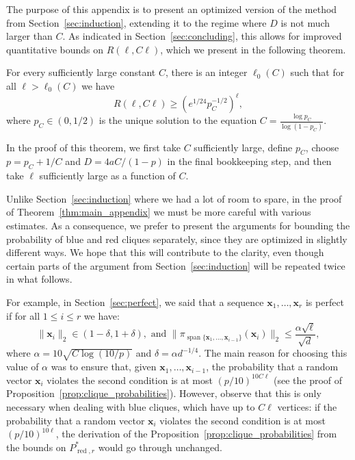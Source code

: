\documentclass[11pt]{amsart}
\theoremstyle{definition}
\def\bx{\boldsymbol{x}}
\DeclareMathOperator{\red}{red}
\DeclareMathOperator{\spn}{span}
\begin{document}
The purpose of this appendix is to present an optimized version of the method from Section~\ref{sec:induction}, extending it to the regime where $D$ is not much larger than $C$. As indicated in Section~\ref{sec:concluding}, this allows for improved quantitative bounds on $R(\ell, C\ell)$, which we present in the following theorem.

\begin{theorem}\label{thm:main_appendix}
For every sufficiently large constant $C$, there is an integer $\ell_0(C)$ such that for all $\ell>\ell_0(C)$ we have 
{\smaller[0.3]
\[R(\ell, C\ell)\geq (e^{1/24}p_C^{-1/2})^\ell,\]
}
where $p_C\in (0, 1/2)$ is the unique solution to the equation $C=\frac{\log p_C}{\log (1-p_C)}$.
\end{theorem}
In the proof of this theorem, we first take $C$ sufficiently large, define $p_C$, choose $p=p_C+1/C$ and $D=4aC/(1-p)$ in the final bookkeeping step, and then take $\ell$ sufficiently large as a function of $C$.

Unlike Section~\ref{sec:induction} where we had a lot of room to spare, in the proof of Theorem~\ref{thm:main_appendix} we must be more careful with various estimates. As a consequence, we prefer to present the arguments for bounding the probability of blue and red cliques separately, since they are optimized in slightly different ways. We hope that this will contribute to the clarity, even though certain parts of the argument from Section~\ref{sec:induction} will be repeated twice in what follows.

For example, in Section~\ref{sec:perfect}, we said that a sequence $\bx_1, \dots, \bx_r$ is perfect if for all $1\leq i \leq r$ we have:
{\smaller[0.3]
\[\|\bx_i\|_2\in (1-\delta, 1+\delta),\text{ and } \|\pi_{\spn\{\bx_1, \dots, \bx_{i-1}\}}(\bx_i)\|_2 \leq \frac{\alpha\sqrt{\ell}}{\sqrt{d}},\]
}
where $\alpha=10\sqrt{C\log (10/p)}$ and $\delta=\alpha d^{-1/4}$. The main reason for choosing this value of $\alpha$ was to ensure that, given $\bx_1, \dots, \bx_{i-1}$, the probability that a random vector $\bx_i$ violates the second condition is at most $(p/10)^{10C\ell}$ (see the proof of Proposition~\ref{prop:clique_probabilities}). However, observe that this is only necessary when dealing with blue cliques, which have up to $C\ell$ vertices: if the probability that a random vector $\bx_i$ violates the second condition is at most $(p/10)^{10\ell}$, the derivation of the Proposition~\ref{prop:clique_probabilities} from the bounds on $P_{\red, r}^*$ would go through unchanged.  
\end{document}
